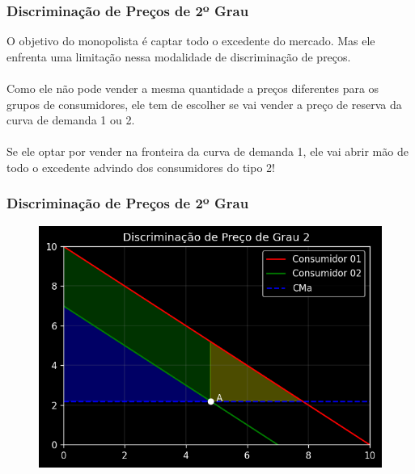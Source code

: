 \documentclass{beamer}[10]
\begin{document}
\begin{frame}
	\frametitle{Discriminação de Preços de 2º Grau}

	O objetivo do monopolista é captar todo o excedente do mercado. Mas ele enfrenta uma limitação nessa modalidade de discriminação de preços.
	\\~\\
	Como ele não pode vender a mesma quantidade a preços diferentes para os grupos de consumidores, ele tem de escolher se vai vender a preço de reserva da curva de demanda 1 ou 2.
	\\~\\
	Se ele optar por vender na fronteira da curva de demanda 1, ele vai abrir mão de todo o excedente advindo dos consumidores do tipo 2!

\end{frame}

\begin{frame}
	\frametitle{Discriminação de Preços de 2º Grau}

	\begin{figure}[H]
		\centering
		\includegraphics[scale=0.7]{cap26_3-discriminacao_grau2_1.png}
	\end{figure}
	
\end{frame}
\end{document}
